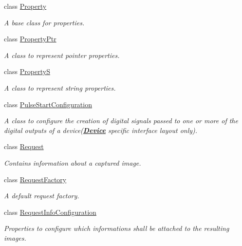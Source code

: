 \begin{DoxyCompactItemize}
class \hyperlink{classmv_i_m_p_a_c_t_1_1acquire_1_1_property}{Property}
\begin{DoxyCompactList}\small\item\em A base class for properties. \end{DoxyCompactList}\item 
class \hyperlink{classmv_i_m_p_a_c_t_1_1acquire_1_1_property_ptr}{Property\+Ptr}
\begin{DoxyCompactList}\small\item\em A class to represent pointer properties. \end{DoxyCompactList}\item 
class \hyperlink{classmv_i_m_p_a_c_t_1_1acquire_1_1_property_s}{Property\+S}
\begin{DoxyCompactList}\small\item\em A class to represent string properties. \end{DoxyCompactList}\item 
class \hyperlink{classmv_i_m_p_a_c_t_1_1acquire_1_1_pulse_start_configuration}{Pulse\+Start\+Configuration}
\begin{DoxyCompactList}\small\item\em A class to configure the creation of digital signals passed to one or more of the digital outputs of a device({\bfseries \hyperlink{classmv_i_m_p_a_c_t_1_1acquire_1_1_device}{Device}} specific interface layout only). \end{DoxyCompactList}\item 
class \hyperlink{classmv_i_m_p_a_c_t_1_1acquire_1_1_request}{Request}
\begin{DoxyCompactList}\small\item\em Contains information about a captured image. \end{DoxyCompactList}\item 
class \hyperlink{classmv_i_m_p_a_c_t_1_1acquire_1_1_request_factory}{Request\+Factory}
\begin{DoxyCompactList}\small\item\em A default request factory. \end{DoxyCompactList}\item 
class \hyperlink{classmv_i_m_p_a_c_t_1_1acquire_1_1_request_info_configuration}{Request\+Info\+Configuration}
\begin{DoxyCompactList}\small\item\em Properties to configure which informations shall be attached to the resulting images. \end{DoxyCompactList}\item 

\end{DoxyCompactItemize}
